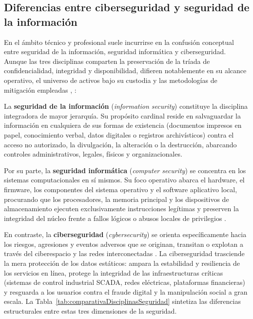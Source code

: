 \documentclass[12pt]{article}
\begin{document}
\subsection{Diferencias entre ciberseguridad y seguridad de la información}\label{subsec:diferenciasCiberseguridadSeguridadInformacion}

En el ámbito técnico y profesional suele incurrirse en la confusión conceptual entre seguridad de la información, seguridad informática y ciberseguridad. Aunque las tres disciplinas comparten la preservación de la tríada de confidencialidad, integridad y disponibilidad, difieren notablemente en su alcance operativo, el universo de activos bajo su custodia y las metodologías de mitigación empleadas \parencite[\S 2.1, p.\ 5]{nistSp800_12}, \parencite[\S 3.1, p.\ 2]{itutX1205}:

La \textbf{seguridad de la información} (\textit{information security}) constituye la disciplina integradora de mayor jerarquía. Su propósito cardinal reside en salvaguardar la información en cualquiera de sus formas de existencia (documentos impresos en papel, conocimiento verbal, datos digitales o registros archivísticos) contra el acceso no autorizado, la divulgación, la alteración o la destrucción, abarcando controles administrativos, legales, físicos y organizacionales.

Por su parte, la \textbf{seguridad informática} (\textit{computer security}) se concentra en los sistemas computacionales en sí mismos. Su foco operativo abarca el hardware, el firmware, los componentes del sistema operativo y el software aplicativo local, procurando que los procesadores, la memoria principal y los dispositivos de almacenamiento ejecuten exclusivamente instrucciones legítimas y preserven la integridad del núcleo frente a fallos lógicos o abusos locales de privilegios \parencite[\S 15.1, p.\ 509]{silberschatz2006fundamentos}.

En contraste, la \textbf{ciberseguridad} (\textit{cybersecurity}) se orienta específicamente hacia los riesgos, agresiones y eventos adversos que se originan, transitan o explotan a través del ciberespacio y las redes interconectadas \parencite[\S 1, p.\ 1]{iso27032}. La ciberseguridad trasciende la mera protección de los datos estáticos: ampara la estabilidad y resiliencia de los servicios en línea, protege la integridad de las infraestructuras críticas (sistemas de control industrial SCADA, redes eléctricas, plataformas financieras) y resguarda a los usuarios contra el fraude digital y la manipulación social a gran escala. La Tabla~\ref{tab:comparativaDisciplinasSeguridad} sintetiza las diferencias estructurales entre estas tres dimensiones de la seguridad.
\end{document}
